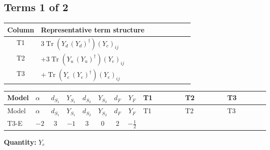 \documentclass[8pt]{article}
\begin{document}
\begin{landscape}
\subsection*{Terms 1 of 2}
\begin{center}
\begin{tabular}{@{}c >{\raggedright\arraybackslash}p{0.82\linewidth}@{}}
\toprule
Column & Representative term structure \\
\midrule
T1 & \(\displaystyle 3 \operatorname{Tr}\!\left({Y_d}\,\left({Y_d}\right)^{\dagger}\right) \left({Y_e}\right)_{ij}\) \\
\midrule
T2 & \(\displaystyle +3 \operatorname{Tr}\!\left({Y_u}\,\left({Y_u}\right)^{\dagger}\right) \left({Y_e}\right)_{ij}\) \\
\midrule
T3 & \(\displaystyle +\operatorname{Tr}\!\left({Y_e}\,\left({Y_e}\right)^{\dagger}\right) \left({Y_e}\right)_{ij}\) \\
\midrule
\bottomrule
\end{tabular}
\end{center}
\smallskip
\tiny
\begin{longtable}{@{}llcccccc >{\raggedright\arraybackslash}p{0.21\linewidth} >{\raggedright\arraybackslash}p{0.21\linewidth} >{\raggedright\arraybackslash}p{0.21\linewidth}@{}}
\toprule
Model & $\alpha$ & $d_{S_1}$ & $Y_{S_1}$ & $d_{S_2}$ & $Y_{S_2}$ & $d_F$ & $Y_F$ & T1 & T2 & T3 \\
\midrule
\endfirsthead
\toprule
Model & $\alpha$ & $d_{S_1}$ & $Y_{S_1}$ & $d_{S_2}$ & $Y_{S_2}$ & $d_F$ & $Y_F$ & T1 & T2 & T3 \\
\midrule
\endhead
T3-E & $-2$ & $3$ & $-1$ & $3$ & $0$ & $2$ & $-\frac{1}{2}$ & \scriptsize\adjustbox{max width=\linewidth}{$\begin{gathered} 3 \operatorname{Tr}\!\left({Y_d}\,\left({Y_d}\right)^{\dagger}\right) \left({Y_e}\right)_{ij}\end{gathered}$} & \scriptsize\adjustbox{max width=\linewidth}{$\begin{gathered} +3 \operatorname{Tr}\!\left({Y_u}\,\left({Y_u}\right)^{\dagger}\right) \left({Y_e}\right)_{ij}\end{gathered}$} & \scriptsize\adjustbox{max width=\linewidth}{$\begin{gathered} +\operatorname{Tr}\!\left({Y_e}\,\left({Y_e}\right)^{\dagger}\right) \left({Y_e}\right)_{ij}\end{gathered}$} \\
\midrule
\bottomrule
\end{longtable}
\clearpage
\noindent\textbf{Quantity: }$Y_e$\par\smallskip

\end{landscape}
\end{document}
